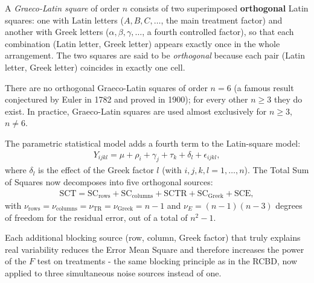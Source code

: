 \begin{definicion}
	A \emph{Graeco-Latin square} of order $n$ consists of two superimposed \textbf{orthogonal} Latin squares: one with Latin letters ($A, B, C, \ldots$, the main treatment factor) and another with Greek letters ($\alpha, \beta, \gamma, \ldots$, a fourth controlled factor), so that each combination (Latin letter, Greek letter) appears exactly once in the whole arrangement. The two squares are said to be \emph{orthogonal} because each pair (Latin letter, Greek letter) coincides in exactly one cell.
\end{definicion}

\begin{observacion}
	There are no orthogonal Graeco-Latin squares of order $n=6$ (a famous result conjectured by Euler in 1782 and proved in 1900); for every other $n \geq 3$ they do exist. In practice, Graeco-Latin squares are used almost exclusively for $n \geq 3$, $n \neq 6$.
\end{observacion}

The parametric statistical model adds a fourth term to the Latin-square model:
\begin{align}
	Y_{ijkl} = \mu + \rho_i + \gamma_j + \tau_k + \delta_l + \epsilon_{ijkl},
	\label{eq:modelo_cuadrado_grecolatino}
\end{align}
where $\delta_l$ is the effect of the Greek factor $l$ (with $i,j,k,l = 1,\ldots,n$). The Total Sum of Squares now decomposes into five orthogonal sources:
\begin{align}
	\text{SCT} = \text{SC}_{\text{rows}} + \text{SC}_{\text{columns}} + \text{SCTR} + \text{SC}_{\text{Greek}} + \text{SCE},
\end{align}
with $\nu_{\text{rows}} = \nu_{\text{columns}} = \nu_{\text{TR}} = \nu_{\text{Greek}} = n-1$ and $\nu_E = (n-1)(n-3)$ degrees of freedom for the residual error, out of a total of $n^2 - 1$.

\begin{observacion}
	Each additional blocking source (row, column, Greek factor) that truly explains real variability reduces the Error Mean Square and therefore increases the power of the $F$ test on treatments - the same blocking principle as in the RCBD, now applied to three simultaneous noise sources instead of one.
\end{observacion}
